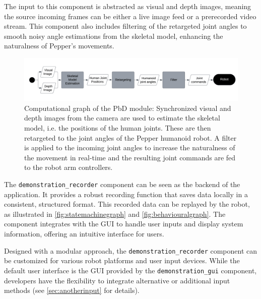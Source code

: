 \documentclass{CSSRforAfrica}
\begin{document}
The input to this component is abstracted as visual and depth images, meaning the source incoming frames can be either a live image feed or a prerecorded video stream. This component also includes filtering of the retargeted joint angles to smooth noisy angle estimations from the skeletal model, enhancing the naturalness of Pepper’s movements.


\newpage

\begin{figure}[ht!]
    \centering
    \includegraphics[width=\textwidth]{figures/ComputationalGraph.png}
    \captionsetup{width=\textwidth}
    \caption{Computational graph of the PbD module: Synchronized visual and depth images from the camera are used to estimate the skeletal model, i.e. the positions of the human joints. These are then retargeted to the joint angles of the Pepper humanoid robot. A filter is applied to the incoming joint angles to increase the naturalness of the movement in real-time and the resulting joint commands are fed to the robot arm controllers.  }
    \label{fig:computationalgraph}
\end{figure}  

The \texttt{demonstration\_recorder} component can be seen as the backend of the application. It provides a robust recording function that saves data locally in a consistent, structured format. This recorded data can be replayed by the robot, as illustrated in \cref{fig:statemachinegraph} and \cref{fig:behaviouralgraph}. The component integrates with the GUI to handle user inputs and display system information, offering an intuitive interface for users.

Designed with a modular approach, the \texttt{demonstration\_recorder} component can be customized for various robot platforms and user input devices. While the default user interface is the GUI provided by the \texttt{demonstration\_gui} component, developers have the flexibility to integrate alternative or additional input methods (see \cref{sec:anotherinput} for details).
\end{document}
